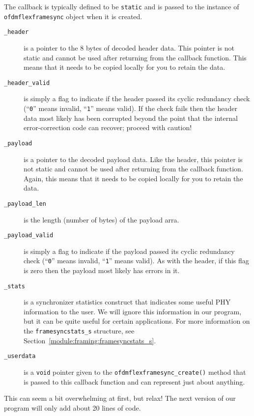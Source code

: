 %
The callback is typically defined to be {\tt static} and is passed to
the instance of {\tt ofdmflexframesync} object when it is created.
%
\begin{description}
\item[{\tt \_header}]
    is a pointer to the 8 bytes of decoded header data.
    This pointer is not static and cannot be used after returning from
    the callback function.
    This means that it needs to be copied locally for you to retain the
    data.
\item[{\tt \_header\_valid}]
    is simply a flag to indicate if the header passed its cyclic
    redundancy check
    (``{\tt 0}'' means invalid, ``{\tt 1}'' means valid).
    If the check fails then the header data most likely has been
    corrupted beyond the point that the internal error-correction code
    can recover; proceed with caution!
\item[{\tt \_payload}]
    is a pointer to the decoded payload data.
    Like the header,
    this pointer is not static and cannot be used after returning from
    the callback function.
    Again, this means that it needs to be copied locally for you to retain the
    data.
\item[{\tt \_payload\_len}]
    is the length (number of bytes) of the payload arra.
\item[{\tt \_payload\_valid}]
    is simply a flag to indicate if the payload passed its cyclic
    redundancy check
    (``{\tt 0}'' means invalid, ``{\tt 1}'' means valid).
    As with the header,
    if this flag is zero then the payload most likely has errors in it.
\item[{\tt \_stats}]
    is a synchronizer statistics construct that indicates some useful
    PHY information to the user.
    We will ignore this information in our program, but it can be quite
    useful for certain applications.
    For more information on the {\tt framesyncstats\_s} structure, see
    Section~\ref{module:framing:framesyncstats_s}.
\item[{\tt \_userdata}]
    is a {\tt void} pointer given to the
    {\tt ofdmflexframesync\_create()} method
    that is passed to this callback function and can represent just
    about anything.
\end{description}
%
This can seem a bit overwhelming at first, but relax!
The next version of our program will only add about 20 lines of code.

%
%
